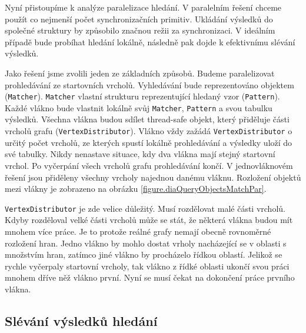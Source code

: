 Nyní přistoupíme k analýze paralelizace hledání.
V paralelním řešení chceme použít co nejmenší počet synchronizačních primitiv.
Ukládání výsledků do společné struktury by způsobilo značnou režii za synchronizaci.
V ideálním případě bude probíhat hledání lokálně, následně pak dojde k efektivnímu slévání výsledků.

Jako řešení jsme zvolili jeden ze základních způsobů.
Budeme paralelizovat prohledávání ze startovních vrcholů.
Vyhledávání bude reprezentováno objektem (\texttt{Matcher}).
\texttt{Matcher} vlastní strukturu reprezentující hledaný vzor (\texttt{Pattern}).
Každé vlákno bude vlastnit lokálně svůj \texttt{Matcher}, \texttt{Pattern} a svou tabulku výsledků.
Všechna vlákna budou sdílet thread-safe objekt, který přiděluje části vrcholů grafu (\texttt{VertexDistributor}).
Vlákno vždy zažádá \texttt{VertexDistributor} o určitý počet vrcholů, ze kterých spustí lokálně prohledávání a výsledky uloží do své tabulky.
Nikdy nenastave situace, kdy dva vlákna mají stejný startovní vrchol.
Po vyčerpání všech vrcholů grafu prohledávání končí.
V jednovláknovém řešení jsou přiděleny všechny vrcholy najednou danému vláknu. 
Rozložení objektů mezi vlákny je zobrazeno na obrázku \ref{figure.diaQueryObjectsMatchPar}. 

\texttt{VertexDistributor} je zde velice důležitý.
Musí rozdělovat malé části vrcholů.
Kdyby rozděloval velké části vrcholů může se stát, že některá vlákna budou mít mnohem více práce.
Je to protože reálné grafy nemají obecně rovnoměrné rozložení hran.
Jedno vlákno by mohlo dostat vrholy nacházející se v oblasti s množstvím hran, zatímco jiné vlákno by procházelo řídkou oblastí.
Jelikož se rychle vyčerpaly startovní vrcholy, tak vlákno z řídké oblasti ukončí svou práci mnohem dříve něž vlákno první.
Nyní se musí čekat na dokončení práce prvního vlákna.

\subsection{Slévání výsledků hledání}

